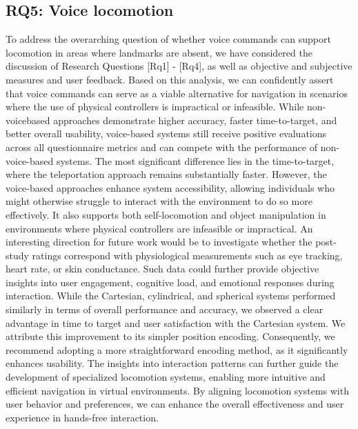 \documentclass[preprint,12pt]{elsarticle}
\newcommand{\reftext}[1]{{\color{gray}#1}}   %
\begin{document}
\subsection{RQ5: Voice locomotion}
\reftext{To address the overarching question of whether voice commands can support locomotion in areas where landmarks are absent, we have considered the discussion of Research Questions [Rq1] - [Rq4], as well as objective and subjective measures and user feedback. Based on this analysis, we can confidently assert that voice commands can serve as a viable alternative for navigation in scenarios where the use of physical controllers is impractical or infeasible. While non-voicebased approaches demonstrate higher accuracy, faster time-to-target, and better overall usability, voice-based systems still receive positive evaluations across all questionnaire metrics and can compete with the performance of non-voice-based systems. The most significant difference lies in the time-to-target, where the teleportation approach remains substantially faster. However, the voice-based approaches enhance system accessibility, allowing individuals who might otherwise struggle to interact with the environment to do so more effectively. It also supports both self-locomotion and object manipulation in environments where physical controllers are infeasible or impractical. An interesting direction for future work would be to investigate whether the post-study ratings correspond with physiological measurements such as eye tracking, heart rate, or skin conductance. Such data could further provide objective insights into user engagement, cognitive load, and emotional responses during interaction. While the Cartesian, cylindrical, and spherical systems performed similarly in terms of overall performance and accuracy, we observed a clear advantage in time to target and user satisfaction with the Cartesian system. We attribute this improvement to its simpler position encoding. Consequently, we recommend adopting a more straightforward encoding method, as it significantly enhances usability. The insights into interaction patterns can further guide the development of specialized locomotion systems, enabling more intuitive and efficient navigation in virtual environments. By aligning locomotion systems with user behavior and preferences, we can enhance the overall effectiveness and user experience in hands-free interaction.}
\end{document}
